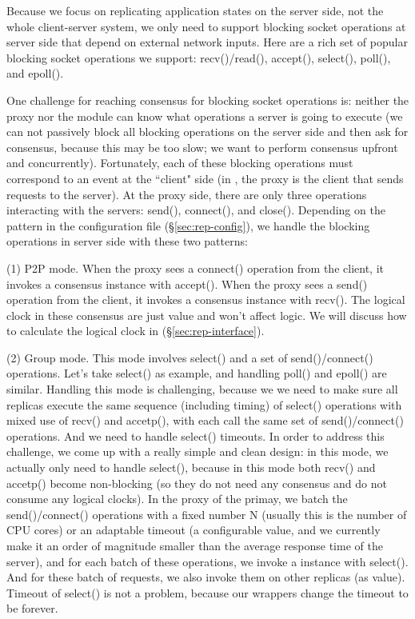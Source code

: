 Because we focus on replicating application states on the server side, not the 
whole client-server system, we only need to support blocking socket operations at server side
that depend on external network inputs. Here are a rich set of popular 
blocking socket operations we support: recv()/read(), accept(), select(), poll(), and 
epoll().

One challenge for reaching consensus for blocking socket operations is: neither the proxy nor 
the \smt module can know what operations a server is going to execute (we can 
not passively block all blocking operations on the server side and then ask for 
consensus, because this may be too slow; we want to perform consensus upfront 
and concurrently). Fortunately, each of these blocking operations must 
correspond to an event at the ``client" side (in \msmr, the proxy is the client 
that sends requests to the server). At the proxy side, there are only three 
operations interacting with the servers: send(), connect(), and close(). 
Depending on the pattern in the configuration file (\S\ref{sec:rep-config}), we 
handle the blocking operations in server side with these two patterns:

(1) P2P mode. When the proxy sees a connect() operation from the client, it invokes a 
consensus instance with accept(). When the proxy sees a send() operation from the client, it 
invokes a consensus instance with recv(). The logical clock in these consensus 
are just value and won't affect \paxos logic. We will discuss how to calculate 
the logical clock in (\S\ref{sec:rep-interface}).

(2) Group mode. This mode involves select() and a set of send()/connect() 
operations. Let's take select() as example, and handling poll() and epoll() are 
similar. Handling this mode is challenging, because we we need to make sure 
all replicas execute the same sequence (including timing) of 
select() operations with mixed use of recv() and accetp(), with each call 
the same set of send()/connect() operations. And we need to handle select() 
timeouts. In order to address this challenge, we come up with a really simple 
and clean design: in this mode, we actually only need to handle select(), 
because in this mode both recv() and accetp() become non-blocking (so they do 
not need any consensus and do not consume any logical clocks). In the 
proxy of the primay, we batch the send()/connect() operations with a fixed 
number N (usually this is the number of CPU cores) or an adaptable timeout (a 
configurable value, and we currently make it an order of magnitude smaller than the 
average response time of the server), and for each batch of these operations, 
we invoke a \paxos instance with select(). And for these batch of requests, we 
also invoke them on other replicas (as \paxos value). Timeout of select() is 
not a problem, because our \smt wrappers change the timeout to be forever.


